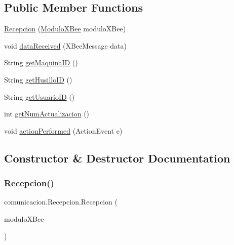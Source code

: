 \subsection*{Public Member Functions}
\begin{DoxyCompactItemize}
\item 
\mbox{\hyperlink{classcomunicacion_1_1_recepcion_a46155e495b5e0f637bb884bf8a0ac7a1}{Recepcion}} (\mbox{\hyperlink{classcomunicacion_1_1_modulo_x_bee}{Modulo\+X\+Bee}} modulo\+X\+Bee)
\item 
void \mbox{\hyperlink{classcomunicacion_1_1_recepcion_a83305dfbd31ca36b129c0cfb4e86a486}{data\+Received}} (X\+Bee\+Message data)
\item 
String \mbox{\hyperlink{classcomunicacion_1_1_recepcion_ab22533d01a1695958053c9898318f993}{get\+Maquina\+ID}} ()
\item 
String \mbox{\hyperlink{classcomunicacion_1_1_recepcion_a28eb0ee1c4a921ad9df8f893ba6809ed}{get\+Husillo\+ID}} ()
\item 
String \mbox{\hyperlink{classcomunicacion_1_1_recepcion_a8beb628d06ac82fdde1ee50157c93bc4}{get\+Usuario\+ID}} ()
\item 
int \mbox{\hyperlink{classcomunicacion_1_1_recepcion_afa39bd7c5b7b749cb28eb948ee130441}{get\+Num\+Actualizacion}} ()
\item 
void \mbox{\hyperlink{classcomunicacion_1_1_recepcion_a803e0127570a68b2135cbe33ad0fb739}{action\+Performed}} (Action\+Event e)
\end{DoxyCompactItemize}


\subsection{Constructor \& Destructor Documentation}
\mbox{\label{classcomunicacion_1_1_recepcion_a46155e495b5e0f637bb884bf8a0ac7a1}} 
\subsubsection{\texorpdfstring{Recepcion()}{Recepcion()}}
{\footnotesize\ttfamily comunicacion.\+Recepcion.\+Recepcion (\begin{DoxyParamCaption}\item[{\mbox{\hyperlink{classcomunicacion_1_1_modulo_x_bee}{Modulo\+X\+Bee}}}]{modulo\+X\+Bee }\end{DoxyParamCaption})}

